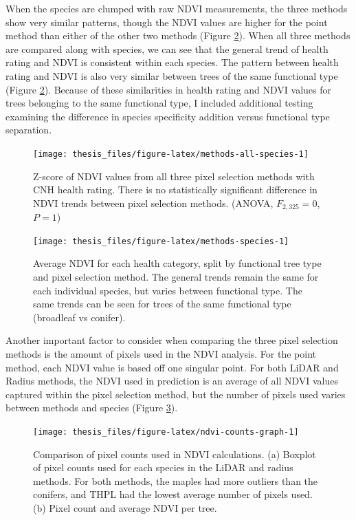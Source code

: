 \documentclass[12pt,twoside]{reedthesis}
\begin{document}
When the species are clumped with raw NDVI measurements, the three
methods show very similar patterns, though the NDVI values are higher
for the point method than either of the other two methods (Figure
\ref{fig:methods-species}). When all three methods are compared along
with species, we can see that the general trend of health rating and
NDVI is consistent within each species. The pattern between health
rating and NDVI is also very similar between trees of the same
functional type (Figure \ref{fig:methods-species}). Because of these
similarities in health rating and NDVI values for trees belonging to the
same functional type, I included additional testing examining the
difference in species specificity addition versus functional type
separation.
\begin{figure}[H]

{\centering \texttt{[image: thesis\_files/figure-latex/methods-all-species-1]} 

}

\caption[Z-score of NDVI and health rating comparison across methods]{Z-score of NDVI values from all three pixel selection methods with CNH health rating. There is no statistically significant difference in NDVI trends between pixel selection methods. (ANOVA, $F_{2, 325}=0$, $P = 1$)}\label{fig:methods-all-species}
\end{figure}
\begin{figure}[H]

{\centering \texttt{[image: thesis\_files/figure-latex/methods-species-1]} 

}

\caption[Average NDVI comparison between species and methods.]{Average NDVI for each health category, split by functional tree type and pixel selection method. The general trends remain the same for each individual species, but varies between functional type. The same trends can be seen for trees of the same functional type (broadleaf vs conifer).}\label{fig:methods-species}
\end{figure}
Another important factor to consider when comparing the three pixel
selection methods is the amount of pixels used in the NDVI analysis. For
the point method, each NDVI value is based off one singular point. For
both LiDAR and Radius methods, the NDVI used in prediction is an average
of all NDVI values captured within the pixel selection method, but the
number of pixels used varies between methods and species (Figure
\ref{fig:ndvi-counts-graph}).
\begin{figure}[H]

{\centering \texttt{[image: thesis\_files/figure-latex/ndvi-counts-graph-1]} 

}

\caption[Pixel counts for NDVI calculation, by method, and for sample NDVI.]{Comparison of pixel counts used in NDVI calculations. (a) Boxplot of pixel counts used for each species in the LiDAR and radius methods. For both methods, the maples had more outliers than the conifers, and THPL had the lowest average number of pixels used. (b) Pixel count and average NDVI per tree.}\label{fig:ndvi-counts-graph}
\end{figure}
\end{document}
